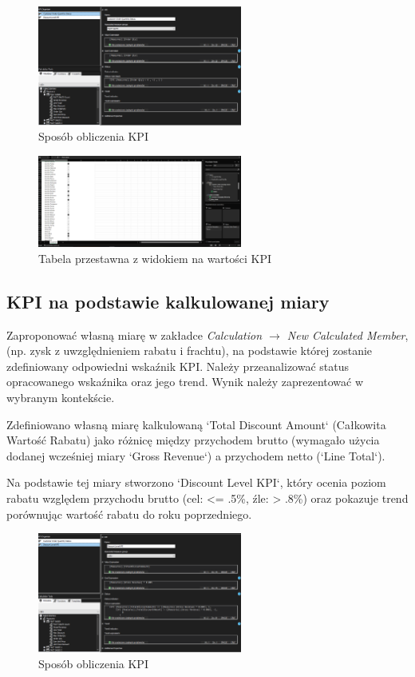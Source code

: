 \documentclass[a4paper,12pt]{article}
\begin{document}
\begin{figure}[H]
  \centering
  \includegraphics[width=0.6\textwidth]{5a.png}
  \caption{Sposób obliczenia KPI}
\end{figure}

\begin{figure}[H]
  \centering
  \includegraphics[width=0.6\textwidth]{5a_analysis.png}
  \caption{Tabela przestawna z widokiem na wartości KPI}
\end{figure}

\subsection{KPI na podstawie kalkulowanej miary}

Zaproponować własną miarę w zakładce \textit{Calculation $\rightarrow$ New Calculated Member},
(np. zysk z uwzględnieniem rabatu i frachtu), na podstawie której zostanie zdefiniowany odpowiedni wskaźnik KPI. Należy przeanalizować status opracowanego wskaźnika oraz jego trend. Wynik należy zaprezentować w wybranym kontekście.

Zdefiniowano własną miarę kalkulowaną `Total Discount Amount` (Całkowita Wartość Rabatu) jako różnicę między przychodem brutto (wymagało użycia dodanej wcześniej miary `Gross Revenue`) a przychodem netto (`Line Total`).

Na podstawie tej miary stworzono `Discount Level KPI`, który ocenia poziom rabatu względem przychodu brutto (cel: <= .5\%, źle: > .8\%) oraz pokazuje trend porównując wartość rabatu do roku poprzedniego.

\begin{figure}[H]
  \centering
  \includegraphics[width=0.6\textwidth]{5b.png}
  \caption{Sposób obliczenia KPI}
\end{figure}
\end{document}

